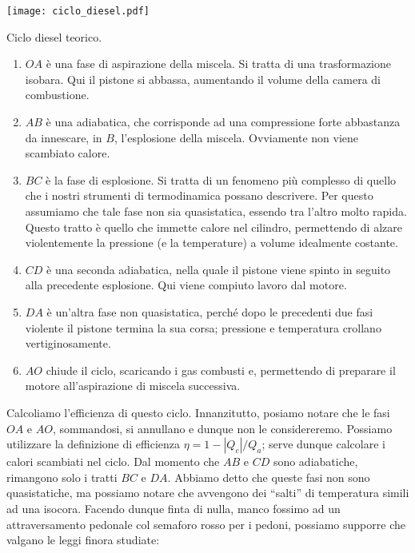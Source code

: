 \begin{marginfigure}
    \centering
    \texttt{[image: ciclo\_diesel.pdf]}
    \caption{Ciclo diesel teorico.}
    \label{erciclodiesel}
\end{marginfigure}

\begin{enumerate}
    \item $OA$ è una fase di aspirazione della miscela. Si
    tratta di una trasformazione isobara. Qui il pistone si
    abbassa, aumentando il volume della camera di combustione.

    \item $AB$ è una adiabatica, che corrisponde ad una compressione
    forte abbastanza da innescare, in $B$, l'esplosione della
    miscela. Ovviamente non viene scambiato calore.

    \item $BC$ è la fase di esplosione. Si tratta di un fenomeno
    più complesso di quello che i nostri strumenti di termodinamica
    possano descrivere. Per questo assumiamo che tale fase non
    sia quasistatica, essendo tra l'altro molto rapida. Questo tratto
    è quello che immette calore
    nel cilindro, permettendo di alzare violentemente la pressione
    (e la temperature) a volume idealmente costante.

    \item $CD$ è una seconda adiabatica, nella quale il pistone
    viene spinto in seguito alla precedente esplosione. Qui viene
    compiuto lavoro dal motore.

    \item $DA$ è un'altra fase non quasistatica, perché dopo le
    precedenti due fasi violente il pistone termina la sua
    corsa; pressione e temperatura crollano vertiginosamente.

    \item $AO$ chiude il ciclo, scaricando i gas combusti e,
    permettendo di preparare il motore all'aspirazione di miscela
    successiva.
\end{enumerate}

Calcoliamo l'efficienza di questo ciclo. Innanzitutto, posiamo
notare che le fasi $OA$ e $AO$, sommandosi, si annullano e dunque
non le considereremo. Possiamo utilizzare la definizione di
efficienza $\eta = 1 - |Q_c|/Q_a$; serve dunque calcolare i
calori scambiati nel ciclo. Dal momento che $AB$ e $CD$ sono
adiabatiche, rimangono solo i tratti $BC$ e $DA$. Abbiamo detto
che queste fasi non sono quasistatiche, ma possiamo notare che
avvengono dei ``salti'' di temperatura simili ad una isocora.
Facendo dunque finta di nulla, manco fossimo ad un attraversamento
pedonale col semaforo rosso per i pedoni,
possiamo supporre che valgano le leggi finora studiate:

